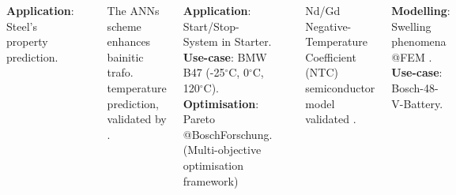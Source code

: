 \documentclass[25pt, a0paper,
portrait,
margin=2mm, 
innermargin=2mm, 
blockverticalspace=7mm, %
colspace=2mm, %
subcolspace=0mm]{tikzposter}
\makeatletter
\newcommand*{\inputfig}[3][htb]{{
    \def\fps@figure{#1}
    \def\DIR{#2}
    \def\LABEL{#3}
    \graphicspath{{\DIR/}}
    
}}
\makeatother
\begin{document}
\begin{columns}
	{
		{
			\textbf{Application}: Steel's property prediction.
			\begin{center}
				\inputfig{floats/ann}{ann}
			\end{center}
			The ANNs scheme 
			enhances bainitic trafo. temperature prediction, validated by \cite{hueter2020}.
		}
		{
			\textbf{Application}: Start/Stop-System in Starter.\\
			\textbf{Use-case}: BMW B47 (-25$^{\circ}$C, 0$^{\circ}$C, 120$^{\circ}$C).\\
			\textbf{Optimisation}: Pareto @BoschForschung.
			(Multi-objective optimisation framework)
			\vspace{-8mm}
			\begin{center}
				\inputfig{floats/semiconductorBA}{semiconductorBA}
			\end{center}
			\vspace{-10mm}
			Nd/Gd Negative-Temperature Coefficient (NTC)
			semiconductor model validated \cite{vo2014}.
		}
		{
			\textbf{Modelling}: Swelling phenomena @FEM \cite{vo2018}.\\
			\textbf{Use-case}: Bosch-48-V-Battery.
		}
	}
	

\end{columns}
\end{document}
